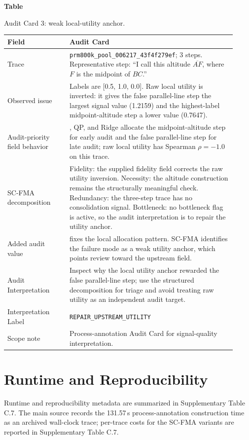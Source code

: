 \par\medskip
{}\label{tab:audit-card-utility}
\noindent\textbf{Table~\thetable}\par
\noindent Audit Card 3: weak local-utility anchor.
\begin{center}
\small
\renewcommand{\arraystretch}{1.08}
\begin{tabular}{p{0.25\linewidth}p{0.67\linewidth}}
\toprule
\textbf{Field} & \textbf{Audit Card} \\
\midrule
Trace & \texttt{prm800k\_pool\_006217\_43f4f279ef}; 3 steps. Representative step: ``I call this altitude $\overline{AF}$, where $F$ is the midpoint of $BC$.'' \\
Observed issue & Labels are [0.5, 1.0, 0.0]. Raw local utility is inverted: it gives the false parallel-line step the largest signal value (1.2159) and the highest-label midpoint-altitude step a lower value (0.7647). \\
Audit-priority field behavior & \wstruct{}, QP, and Ridge allocate the midpoint-altitude step for early audit and the false parallel-line step for late audit; raw local utility has Spearman $\rho=-1.0$ on this trace. \\
SC-FMA decomposition & Fidelity: the supplied fidelity field corrects the raw utility inversion. Necessity: the altitude construction remains the structurally meaningful check. Redundancy: the three-step trace has no consolidation signal. Bottleneck: no bottleneck flag is active, so the audit interpretation is to repair the utility anchor. \\
Added audit value & \wstruct{} fixes the local allocation pattern. SC-FMA identifies the failure mode as a weak utility anchor, which points review toward the upstream field. \\
Audit Interpretation & Inspect why the local utility anchor rewarded the false parallel-line step; use the structured decomposition for triage and avoid treating raw utility as an independent audit target. \\
Interpretation Label & \texttt{REPAIR\_UPSTREAM\_UTILITY} \\
Scope note & Process-annotation Audit Card for signal-quality interpretation. \\
\bottomrule
\end{tabular}
\end{center}
\medskip

\section{Runtime and Reproducibility}
\label{app:runtime-reproducibility}

Runtime and reproducibility metadata are summarized in Supplementary Table C.7. The main source records the 131.57\,s process-annotation construction time as an archived wall-clock trace; per-trace costs for the SC-FMA variants are reported in Supplementary Table C.7.


\clearpage

